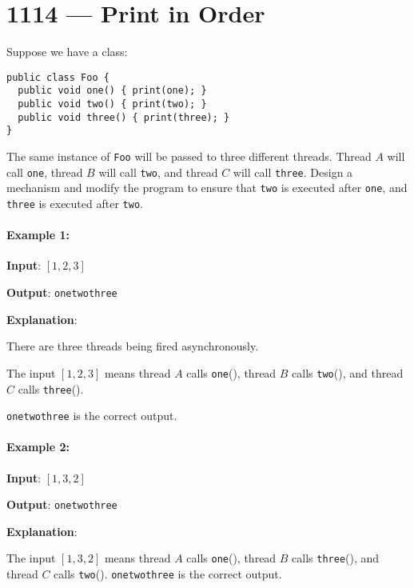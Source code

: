 \section{1114 --- Print in Order}
Suppose we have a class:

\begin{lstlisting}[style=customc]
public class Foo {
  public void one() { print(one); }
  public void two() { print(two); }
  public void three() { print(three); }
}
\end{lstlisting}

The same instance of \texttt{Foo} will be passed to three different threads. Thread $A$ will call \texttt{one}, thread $B$ will call \texttt{two}, and thread $C$ will call \texttt{three}. Design a mechanism and modify the program to ensure that \texttt{two} is executed after \texttt{one}, and \texttt{three} is executed after \texttt{two}.

 

\paragraph{Example 1:}

\begin{flushleft}
\textbf{Input}: $[1,2,3]$

\textbf{Output}: \texttt{onetwothree}

\textbf{Explanation}: 

There are three threads being fired asynchronously. 

The input $[1,2,3]$ means thread $A$ calls \texttt{one}(), thread $B$ calls \texttt{two}(), and thread $C$ calls \texttt{three}(). 

\texttt{onetwothree} is the correct output.
\end{flushleft}


\paragraph{Example 2:}

\begin{flushleft}
\textbf{Input}: $[1,3,2]$

\textbf{Output}: \texttt{onetwothree}

\textbf{Explanation}: 

The input $[1,3,2]$ means thread $A$ calls \texttt{one}(), thread $B$ calls \texttt{three}(), and thread $C$ calls \texttt{two}(). \texttt{onetwothree} is the correct output.
\end{flushleft}
 

